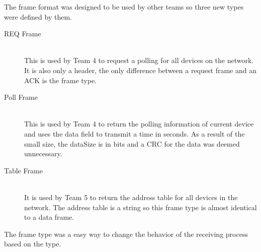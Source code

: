 The frame format was designed to be used by other teams so three new types were defined by them.
\begin{description}
  \item[REQ Frame] \hfill \\
This is used by Team 4 to request a polling for all devices on the network. It is also only a header, the only difference between a request frame and an ACK is the frame type.
  \item[Poll Frame] \hfill \\
 This is used by Team 4 to return the polling information of current device and uses the data field to transmit a time in seconds. As a result of the small size, the dataSize is in bits and a CRC for the data was deemed unnecessary.
  \item[Table Frame] \hfill \\
 It is used by Team 5 to return the address table for all devices in the network. The address table is a string so this frame type is almost identical to a data frame.

\end{description} 

The frame type was a easy way to change the behavior of the receiving process based on the type.  


